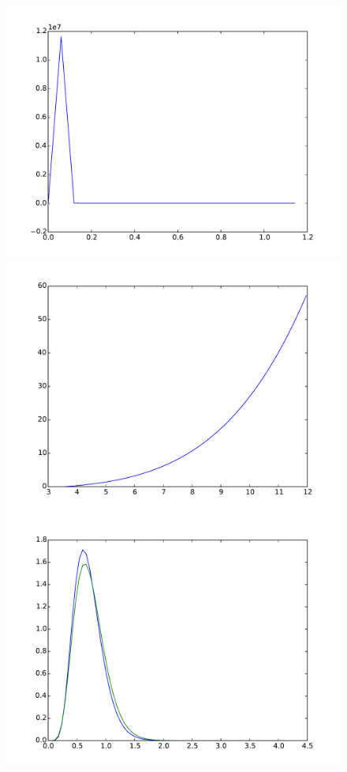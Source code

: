 \documentclass{article}
\begin{document}
\begin{figure}[htb]
\begin{minipage}{.3\textwidth}
		\includegraphics[width=0.97\linewidth]{bootstrap-filter/relative_beginning_complex_4_3.pdf}
	\end{minipage}
	\begin{minipage}{.3\textwidth}
		\centering
		\includegraphics[width=0.97\linewidth]{bootstrap-filter/relative_tail_complex_4_3.pdf}
	\end{minipage}
	\begin{minipage}{.3\textwidth}
		\centering
		\includegraphics[width=0.97\linewidth]{bootstrap-filter/global_complex_3_10.pdf}

\end{minipage}
\end{figure}
\end{document}
